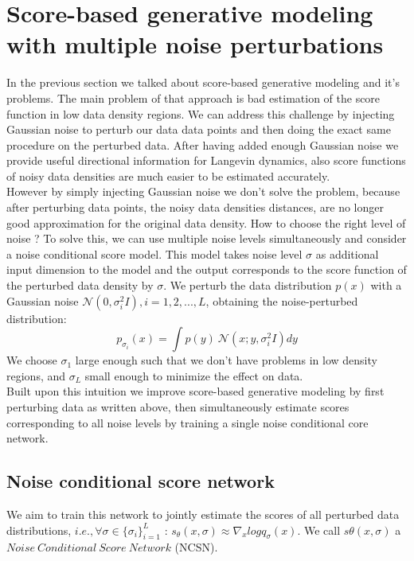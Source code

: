 \documentclass{article}
\begin{document}
    \section{Score-based generative modeling with multiple noise perturbations}
    In the previous section we talked about score-based generative modeling and it's problems. The main problem of that approach is bad estimation of the score function in low data density regions. We can address this challenge by injecting Gaussian noise to perturb our data data points and then doing the exact same procedure on the perturbed data. After having added enough Gaussian noise we provide useful directional information for Langevin dynamics, also score functions of noisy data densities are much easier to be estimated accurately. \\
    \newline
    However by simply injecting Gaussian noise we don't solve the problem, because after perturbing data points, the noisy data densities distances, are no longer good approximation for the original data density. How to choose the right level of noise ? To solve this, we can use multiple noise levels simultaneously and consider a noise conditional score model. This model takes noise level $\sigma$ as additional input dimension to the model and the output corresponds to the score function of the perturbed data density by $\sigma$.  We perturb the data distribution $p(x)$ with a Gaussian noise $\mathcal{N}(0,\sigma_{i}^{2}I), i=1,2,...,L$, obtaining the noise-perturbed distribution:
    \begin{equation}
    p_{\sigma_{i}}(x) = \int p(y)\ \mathcal{N}(x;y,\sigma_{i}^{2}I) dy
    \end{equation}
    We choose $\sigma_{1}$ large enough such that we don't have problems in low density regions, and $\sigma_{L}$ small enough to minimize the effect on data.\\
    Built upon this intuition we improve score-based generative modeling by first perturbing data as written above, then simultaneously estimate scores corresponding to all noise levels by training a single noise conditional core network.
    \subsection{Noise conditional score network}
    We aim to train this network to jointly estimate the scores of all perturbed data distributions, $i.e., \forall \sigma \in \{ \sigma_{i} \}_{i=1}^{L}$ : $s_{\theta}(x,\sigma) \approx \nabla_{x}logq_{\sigma}(x)$. We call $s{\theta}(x,\sigma)$ a $Noise\ Conditional\ Score\ Network$ (NCSN).
\end{document}
